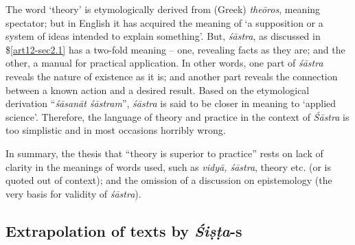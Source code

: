 The word `theory' is etymologically derived from (Greek) {\sl theōros}, meaning spectator; but in English it has acquired the meaning of `a supposition or a system of ideas intended to explain something'. But, {\sl śāstra}, as discussed in \$\ref{art12-sec2.1} has a two-fold meaning -- one, revealing facts as they are; and the other, a manual for practical application. In other words, one part of {\sl śāstra} reveals the nature of existence as it is; and another part reveals the connection between a known action and a desired result. Based on the etymological derivation ``{\sl śāsanāt śāstram}'', {\sl śāstra} is said to be closer in meaning to `applied science'. Therefore, the language of theory and practice in the context of {\sl Śāstra} is too simplistic and in most occasions horribly wrong. 

In summary, the thesis that ``theory is superior to practice'' rests on lack of clarity in the meanings of words used, such as {\sl vidyā, śāstra}, theory etc. (or is quoted out of context); and the omission of a discussion on epistemology (the very basis for validity of {\sl śāstra}). 

\subsection{Extrapolation of texts by {{\sl\bfseries Śiṣṭa}\relax}-s}\label{art12-sec3.6}

